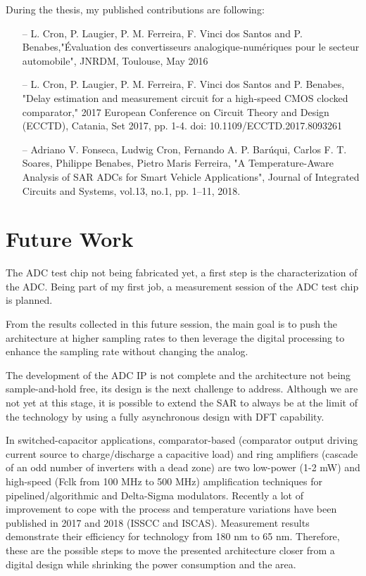 During the thesis, my published contributions are following:
\begin{itemize}
	\item[--] L. Cron, P. Laugier, P. M. Ferreira, F. Vinci dos Santos and P. Benabes,"Évaluation des convertisseurs analogique-numériques pour le secteur automobile", JNRDM, Toulouse, May 2016
	\item[--] L. Cron, P. Laugier, P. M. Ferreira, F. Vinci dos Santos and P. Benabes, "Delay estimation and measurement circuit for a high-speed CMOS clocked comparator," 2017 European Conference on Circuit Theory and Design (ECCTD), Catania, Set 2017, pp. 1-4. doi: 10.1109/ECCTD.2017.8093261
	\item[--] Adriano V. Fonseca, Ludwig Cron, Fernando A. P. Barúqui, Carlos F. T. Soares, Philippe Benabes, Pietro Maris Ferreira, "A Temperature-Aware Analysis of SAR ADCs for Smart Vehicle Applications", Journal of Integrated Circuits and Systems, vol.13, no.1, pp. 1--11, 2018.
\end{itemize}

\clearpage
\section{Future Work}          %
The ADC test chip not being fabricated yet, a first step is the characterization of the ADC\@. Being part of my first job, a measurement session of the ADC test chip is planned.

From the results collected in this future session, the main goal is to push the architecture at higher sampling rates to then leverage the digital processing to enhance the sampling rate without changing the analog.

The development of the ADC IP is not complete and the architecture not being sample-and-hold free, its design is the next challenge to address. Although we are not yet at this stage, it is possible to extend the SAR to always be at the limit of the technology by using a fully asynchronous design with DFT capability.

In switched-capacitor applications, comparator-based (comparator output driving current source to charge/discharge a capacitive load) and ring amplifiers (cascade of an odd number of inverters with a dead zone) are two low-power (1-2 mW) and high-speed (Fclk from 100 MHz to 500 MHz) amplification techniques for pipelined/algorithmic and Delta-Sigma modulators. Recently a lot of improvement to cope with the process and temperature variations have been published in 2017 and 2018 (ISSCC and ISCAS). Measurement results demonstrate their efficiency for technology from 180 nm to 65 nm. Therefore, these are the possible steps to move the presented architecture closer from a digital design while shrinking the power consumption and the area.


